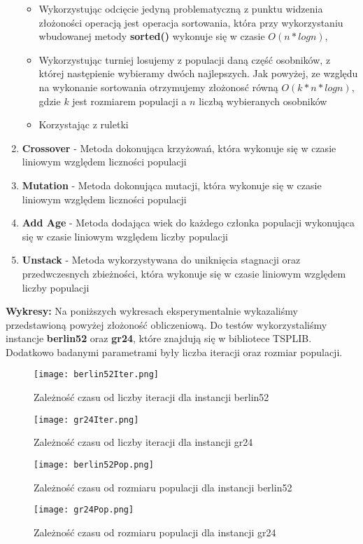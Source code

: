 \begin{enumerate}
\begin{itemize}
        \item Wykorzystując odcięcie jedyną problematyczną z punktu widzenia złożoności operacją jest operacja sortowania, która przy wykorzystaniu wbudowanej metody \textbf{sorted()} wykonuje się w czasie \textbf{$O(n*log n)$},
        \item Wykorzystując turniej losujemy z populacji daną część osobników, z której następienie wybieramy dwóch najlepszych. Jak powyżej, ze względu na wykonanie sortowania otrzymujemy złożonosć równą \textbf{$O(k*n*log n)$}, gdzie $k$ jest rozmiarem populacji a $n$ liczbą wybieranych osobników
        \item Korzystając z ruletki 
      \end{itemize}
      \item \textbf{Crossover} - Metoda dokonująca krzyżowań, która wykonuje się w czasie liniowym względem liczności populacji
      \item \textbf{Mutation} - Metoda dokonująca mutacji, która wykonuje się w czasie liniowym względem liczności populacji
      \item \textbf{Add Age} - Metoda dodająca wiek do każdego członka populacji wykonująca się w czasie liniowym względem liczby populacji 
      \item \textbf{Unstack} - Metoda wykorzystywana do uniknięcia stagnacji oraz przedwczesnych zbieżności, która wykonuje się w czasie liniowym względem liczby populacji 

    \end{enumerate}
  \textbf{Wykresy:}
  Na poniższych wykresach eksperymentalnie wykazaliśmy przedstawioną powyżej złożoność obliczeniową. 
  Do testów wykorzystaliśmy instancje \textbf{berlin52} oraz \textbf{gr24}, które znajdują się w bibliotece TSPLIB.
  Dodatkowo badanymi parametrami były liczba iteracji oraz rozmiar populacji.
  \begin{figure}[H]
    \texttt{[image: berlin52Iter.png]}
    \centering
    \caption{Zależność czasu od liczby iteracji dla instancji berlin52}
  \end{figure}
  \begin{figure}[H]
    \texttt{[image: gr24Iter.png]}
    \centering
    \caption{Zależność czasu od liczby iteracji dla instancji gr24}
  \end{figure}
  \begin{figure}[H]
    \texttt{[image: berlin52Pop.png]}
    \centering
    \caption{Zależność czasu od rozmiaru populacji dla instancji berlin52}
  \end{figure}
  \begin{figure}[H]
    \texttt{[image: gr24Pop.png]}
    \centering
    \caption{Zależność czasu od rozmiaru populacji dla instancji gr24}
  \end{figure}

